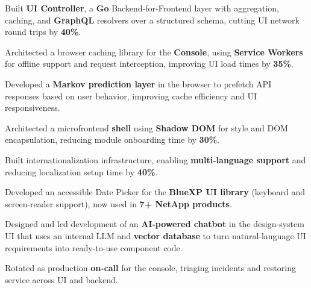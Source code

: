 
\begin{resumeitemize}
    \item Built \textbf{UI Controller}, a \textbf{Go} Backend-for-Frontend layer with aggregation, caching, and \textbf{GraphQL} resolvers over a structured schema, cutting UI network round trips by \textbf{40\%}.
    \item Architected a browser caching library for the \textbf{Console}, using \textbf{Service Workers} for offline support and request interception, improving UI load times by \textbf{35\%}.
    \item Developed a \textbf{Markov prediction layer} in the browser to prefetch API responses based on user behavior, improving cache efficiency and UI responsiveness.
    \item Architected a microfrontend \textbf{shell} using \textbf{Shadow DOM} for style and DOM encapsulation, reducing module onboarding time by \textbf{30\%}.
    \item Built internationalization infrastructure, enabling \textbf{multi-language support} and reducing localization setup time by \textbf{40\%}.
    \item Developed an accessible Date Picker for the \textbf{BlueXP UI library} (keyboard and screen-reader support), now used in \textbf{7+ NetApp products}.
    \item Designed and led development of an \textbf{AI-powered chatbot} in the design-system UI that uses an internal LLM and \textbf{vector database} to turn natural-language UI requirements into ready-to-use component code.
    \item Rotated as production \textbf{on-call} for the console, triaging incidents and restoring service across UI and backend.
\end{resumeitemize}
